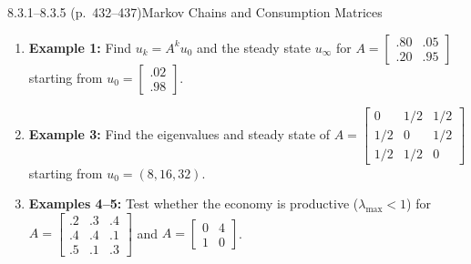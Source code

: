 \documentclass[11pt,a4paper,openany,oneside]{book}
\def\vect#1{#1}%
\def\mathbf#1{#1}%
\newcommand{\vect}[1]{\mathbf{#1}}
\numberwithin{equation}{chapter}
\begin{document}
\begin{example}{8.3.1--8.3.5 (p.\ 432--437)}{Markov Chains and Consumption Matrices}
\begin{enumerate}
\item \textbf{Example 1:} Find $\vect{u}_k = A^k\vect{u}_0$ and the steady state $\vect{u}_\infty$ for $A = \begin{bmatrix}.80 & .05\\.20 & .95\end{bmatrix}$ starting from $\vect{u}_0 = \begin{bmatrix}.02\\.98\end{bmatrix}$.
\item \textbf{Example 3:} Find the eigenvalues and steady state of $A = \begin{bmatrix}0 & 1/2 & 1/2\\1/2 & 0 & 1/2\\1/2 & 1/2 & 0\end{bmatrix}$ starting from $\vect{u}_0 = (8,16,32)$.
\item \textbf{Examples 4--5:} Test whether the economy is productive ($\lambda_{\max} < 1$) for $A = \begin{bmatrix}.2&.3&.4\\.4&.4&.1\\.5&.1&.3\end{bmatrix}$ and $A = \begin{bmatrix}0&4\\1&0\end{bmatrix}$.
\end{enumerate}
\end{example}
\end{document}
